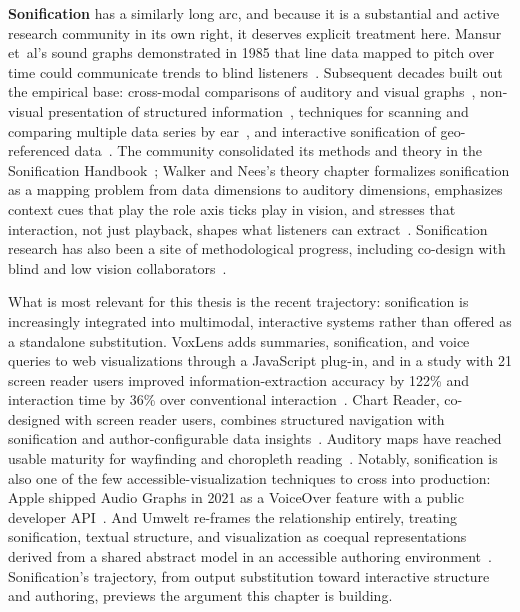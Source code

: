 \documentclass[12pt]{cmuthesis}
\newcommand{\ea}{{et~al\xperiod}\xspace}
\begin{document}
\textbf{Sonification} has a similarly long arc, and because it is a substantial and active research community in its own right, it deserves explicit treatment here. Mansur \ea's sound graphs demonstrated in 1985 that line data mapped to pitch over time could communicate trends to blind listeners~\cite{Mansur1985Sound}. Subsequent decades built out the empirical base: cross-modal comparisons of auditory and visual graphs~\cite{Flowers1997Cross}, non-visual presentation of structured information~\cite{Brewster2002Visualization}, techniques for scanning and comparing multiple data series by ear~\cite{McGookin2006SoundBar}, and interactive sonification of geo-referenced data~\cite{Zhao2008Data}. The community consolidated its methods and theory in the Sonification Handbook~\cite{Hermann2011}; Walker and Nees's theory chapter formalizes sonification as a mapping problem from data dimensions to auditory dimensions, emphasizes context cues that play the role axis ticks play in vision, and stresses that interaction, not just playback, shapes what listeners can extract~\cite{Walker2011Theory}. Sonification research has also been a site of methodological progress, including co-design with blind and low vision collaborators~\cite{Cullen2019Co}.
 
What is most relevant for this thesis is the recent trajectory: sonification is increasingly integrated into multimodal, interactive systems rather than offered as a standalone substitution. VoxLens adds summaries, sonification, and voice queries to web visualizations through a JavaScript plug-in, and in a study with 21 screen reader users improved information-extraction accuracy by 122\% and interaction time by 36\% over conventional interaction~\cite{Sharif2022VoxLens}. Chart Reader, co-designed with screen reader users, combines structured navigation with sonification and author-configurable data insights~\cite{Thompson2023Chart}. Auditory maps have reached usable maturity for wayfinding and choropleth reading~\cite{Biggs2022Audiom}. Notably, sonification is also one of the few accessible-visualization techniques to cross into production: Apple shipped Audio Graphs in 2021 as a VoiceOver feature with a public developer API~\cite{Apple2021AudioGraphs}. And Umwelt re-frames the relationship entirely, treating sonification, textual structure, and visualization as coequal representations derived from a shared abstract model in an accessible authoring environment~\cite{Zong2024}. Sonification's trajectory, from output substitution toward interactive structure and authoring, previews the argument this chapter is building.
 
\end{document}
